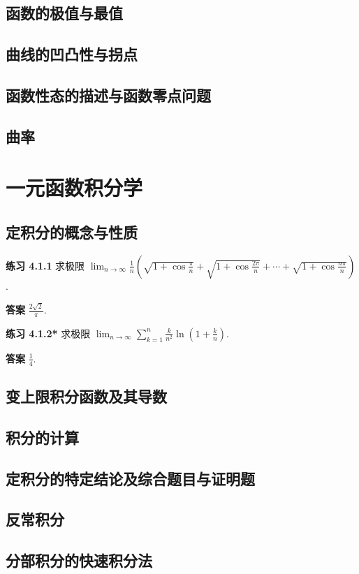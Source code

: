\documentclass[lang=cn,10pt]{elegantbook}
\begin{document}
\section{函数的极值与最值}

\section{曲线的凹凸性与拐点}

\section{函数性态的描述与函数零点问题}

\section{曲率}

\chapter{一元函数积分学}
\section{定积分的概念与性质}
\textbf{练习 4.1.1} 求极限 $\lim_{n \to \infty} \frac{1}{n} \left( \sqrt{1 + \cos \frac{\pi}{n}} + \sqrt{1 + \cos \frac{2\pi}{n}} + \cdots + \sqrt{1 + \cos \frac{n\pi}{n}} \right)$.

\textbf{答案} $\frac{2\sqrt{2}}{\pi}$.



\textbf{练习 4.1.2*} 求极限 $\lim_{n \to \infty} \sum_{k=1}^{n} \frac{k}{n^2} \ln \left( 1 + \frac{k}{n} \right)$.

\textbf{答案} $\frac{1}{4}$.
\section{变上限积分函数及其导数}
\section{积分的计算}
\section{定积分的特定结论及综合题目与证明题}
\section{反常积分}
\section{分部积分的快速积分法}
\end{document}
